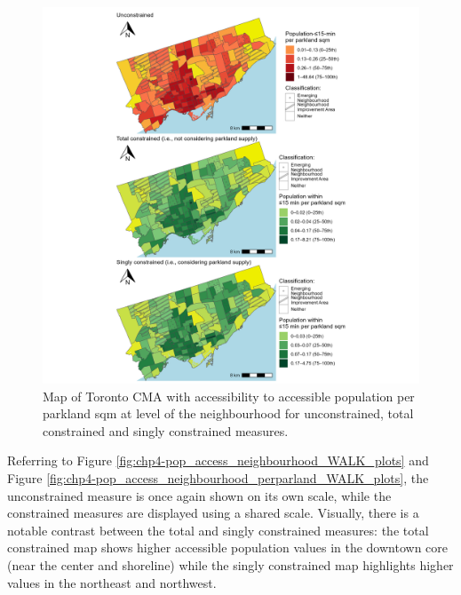\documentclass[
11pt, %
oneside, %
english, %
singlespacing, %
]{macthesis} %
\begin{document}
\begin{figure}

{\centering \includegraphics[width=6in]{./data/figures/chp4-pop_access_neighbourhood_perparland_WALK_plots} 

}

\caption{\label{fig:chp4-pop_access_neighbourhood_perparland_WALK_plots} Map of Toronto CMA with accessibility to accessible population per parkland sqm at level of the neighbourhood for unconstrained, total constrained and singly constrained measures.}\label{fig:unnamed-chunk-72}
\end{figure}

Referring to Figure \ref{fig:chp4-pop_access_neighbourhood_WALK_plots} and Figure \ref{fig:chp4-pop_access_neighbourhood_perparland_WALK_plots}, the unconstrained measure is once again shown on its own scale, while the constrained measures are displayed using a shared scale. Visually, there is a notable contrast between the total and singly constrained measures: the total constrained map shows higher accessible population values in the downtown core (near the center and shoreline) while the singly constrained map highlights higher values in the northeast and northwest.
\end{document}
